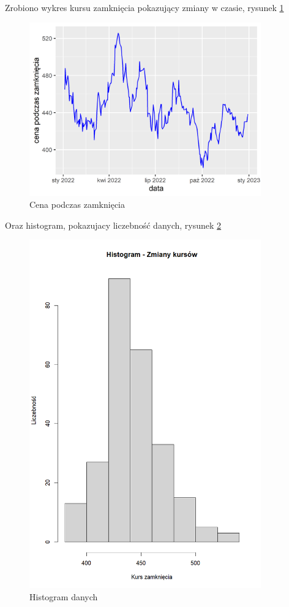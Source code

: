 \documentclass[a4paper,11pt]{article}
\begin{document}
Zrobiono wykres  kursu zamknięcia pokazujący zmiany w czasie, rysunek \ref{fig:cena_podcaz_zamkn}

\begin{figure}[h]
  \centering
  \includegraphics[width=10cm]{cena_poczas_zamkn.png}
  \caption{Cena podczas zamknięcia}
  \label{fig:cena_podcaz_zamkn}
\end{figure}

Oraz histogram, pokazujacy liczebność danych, rysunek \ref{fig:histogram}
\begin{figure}[h]
  \centering
  \includegraphics[width=10cm]{histogram.png}
  \caption{Histogram danych}
  \label{fig:histogram}
\end{figure}
\end{document}
